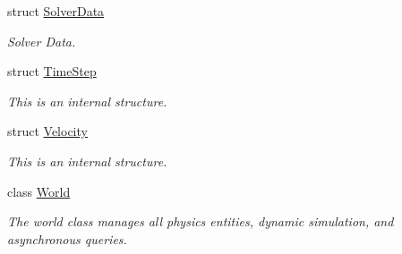 \begin{DoxyCompactItemize}
struct \hyperlink{struct_farseer_physics_1_1_dynamics_1_1_solver_data}{Solver\+Data}
\begin{DoxyCompactList}\small\item\em Solver Data. \end{DoxyCompactList}\item 
struct \hyperlink{struct_farseer_physics_1_1_dynamics_1_1_time_step}{Time\+Step}
\begin{DoxyCompactList}\small\item\em This is an internal structure. \end{DoxyCompactList}\item 
struct \hyperlink{struct_farseer_physics_1_1_dynamics_1_1_velocity}{Velocity}
\begin{DoxyCompactList}\small\item\em This is an internal structure. \end{DoxyCompactList}\item 
class \hyperlink{class_farseer_physics_1_1_dynamics_1_1_world}{World}
\begin{DoxyCompactList}\small\item\em The world class manages all physics entities, dynamic simulation, and asynchronous queries. \end{DoxyCompactList}\end{DoxyCompactItemize}
